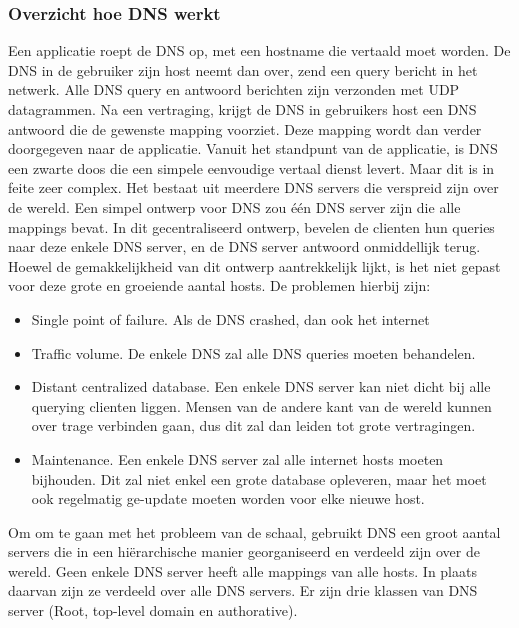 \clearpage

\subsubsection{Overzicht hoe DNS werkt}

Een applicatie roept de DNS op, met een hostname die vertaald moet worden. De DNS in de gebruiker zijn host neemt dan over, zend een query bericht in het netwerk. Alle DNS query en antwoord berichten zijn verzonden met UDP datagrammen. Na een vertraging, krijgt de DNS in gebruikers host een DNS antwoord die de gewenste mapping voorziet. Deze mapping wordt dan verder doorgegeven naar de applicatie.
Vanuit het standpunt van de applicatie, is DNS een zwarte doos die een simpele eenvoudige vertaal dienst levert. Maar dit is in feite zeer complex. Het bestaat uit meerdere DNS servers die verspreid zijn over de wereld.
Een simpel ontwerp voor DNS zou één DNS server zijn die alle mappings bevat. In dit gecentraliseerd ontwerp, bevelen de clienten hun queries naar deze enkele DNS server, en de DNS server antwoord onmiddellijk terug. Hoewel de gemakkelijkheid van dit ontwerp aantrekkelijk lijkt, is het niet gepast voor deze grote en groeiende aantal hosts. De problemen hierbij zijn:

\begin{itemize}
    \item Single point of failure. Als de DNS crashed, dan ook het internet
\item Traffic volume. De enkele DNS zal alle DNS queries moeten behandelen.
\item Distant centralized database. Een enkele DNS server kan niet dicht bij alle querying clienten liggen. Mensen van de andere kant van de wereld kunnen over trage verbinden gaan, dus dit zal dan leiden tot grote vertragingen.
\item Maintenance. Een enkele DNS server zal alle internet hosts moeten bijhouden. Dit zal niet enkel een grote database opleveren, maar het moet ook regelmatig ge-update moeten worden voor elke nieuwe host.
\end{itemize}

\clearpage


Om om te gaan met het probleem van de schaal, gebruikt DNS een groot aantal servers die in een hiërarchische manier georganiseerd en verdeeld zijn over de wereld. Geen enkele DNS server heeft alle mappings van alle hosts. In plaats daarvan zijn ze verdeeld over alle DNS servers. Er zijn drie klassen van DNS server (Root, top-level domain en authorative).

